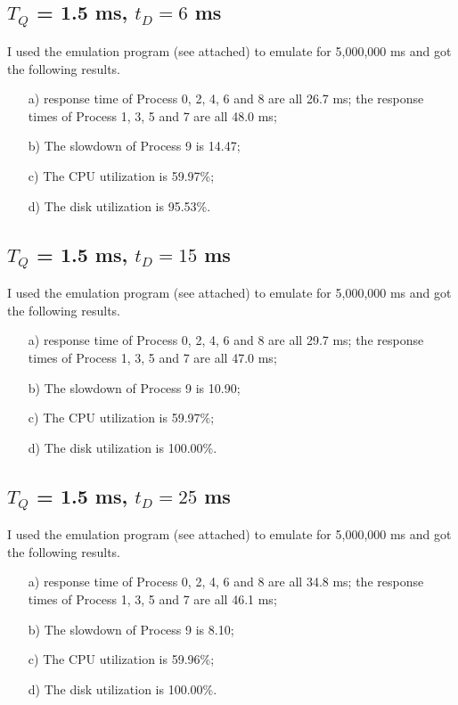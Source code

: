 \documentclass[12pt,letterpaper]{article}
\begin{document}
\subsection{$T_Q$ = 1.5 ms, $t_D=6$ ms}
I used the emulation program (see attached) to emulate for 5,000,000 ms and got the following results.
\begin{enumerate}
\item[a)] response time of Process 0, 2, 4, 6 and 8 are all 26.7 ms; the response times of Process 1, 3, 5 and 7 are all 48.0 ms;
\item[b)] The slowdown of Process 9 is 14.47;
\item[c)] The CPU utilization is 59.97\%;
\item[d)] The disk utilization is 95.53\%.
\end{enumerate}

\subsection{$T_Q$ = 1.5 ms, $t_D=15$ ms}
I used the emulation program (see attached) to emulate for 5,000,000 ms and got the following results.
\begin{enumerate}
\item[a)] response time of Process 0, 2, 4, 6 and 8 are all 29.7 ms; the response times of Process 1, 3, 5 and 7 are all 47.0 ms;
\item[b)] The slowdown of Process 9 is 10.90;
\item[c)] The CPU utilization is 59.97\%;
\item[d)] The disk utilization is 100.00\%.
\end{enumerate}

\subsection{$T_Q$ = 1.5 ms, $t_D=25$ ms}
I used the emulation program (see attached) to emulate for 5,000,000 ms and got the following results.
\begin{enumerate}
\item[a)] response time of Process 0, 2, 4, 6 and 8 are all 34.8 ms; the response times of Process 1, 3, 5 and 7 are all 46.1 ms;
\item[b)] The slowdown of Process 9 is 8.10;
\item[c)] The CPU utilization is 59.96\%;
\item[d)] The disk utilization is 100.00\%.
\end{enumerate}
\end{document}
